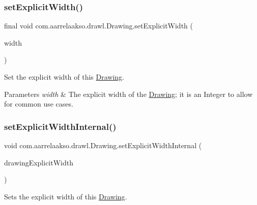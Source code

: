 \subsubsection{\texorpdfstring{set\+Explicit\+Width()}{setExplicitWidth()}\hspace{0.1cm}{\footnotesize\ttfamily [3/3]}}
{\footnotesize\ttfamily final void com.\+aarrelaakso.\+drawl.\+Drawing.\+set\+Explicit\+Width (\begin{DoxyParamCaption}\item[{final Integer}]{width }\end{DoxyParamCaption})}



Set the explicit width of this \hyperlink{classcom_1_1aarrelaakso_1_1drawl_1_1_drawing}{Drawing}. 


\begin{DoxyParams}{Parameters}
{\em width} & The explicit width of the \hyperlink{classcom_1_1aarrelaakso_1_1drawl_1_1_drawing}{Drawing}; it is an Integer to allow for common use cases. \\
\hline
\end{DoxyParams}
\mbox{\label{classcom_1_1aarrelaakso_1_1drawl_1_1_drawing_a7083d7046d42a99050495007854b5908}} 
\subsubsection{\texorpdfstring{set\+Explicit\+Width\+Internal()}{setExplicitWidthInternal()}}
{\footnotesize\ttfamily void com.\+aarrelaakso.\+drawl.\+Drawing.\+set\+Explicit\+Width\+Internal (\begin{DoxyParamCaption}\item[{@Not\+Null final \hyperlink{interfacecom_1_1aarrelaakso_1_1drawl_1_1_number}{Number}}]{drawing\+Explicit\+Width }\end{DoxyParamCaption})\hspace{0.3cm}{\ttfamily [private]}}



Sets the explicit width of this \hyperlink{classcom_1_1aarrelaakso_1_1drawl_1_1_drawing}{Drawing}. 

